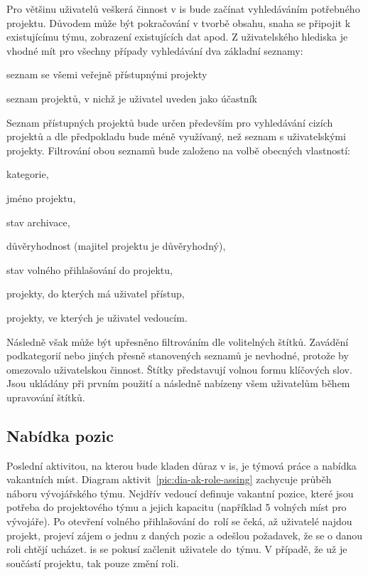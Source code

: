 Pro většinu uživatelů veškerá činnost v \gls{is} bude začínat vyhledáváním potřebného projektu. Důvodem může být pokračování v tvorbě obsahu, snaha se připojit k existujícímu týmu, zobrazení existujících dat apod. Z uživatelského hlediska je vhodné mít pro všechny případy vyhledávání dva základní seznamy:

\begin{ulnar}
   \item seznam se všemi veřejně přístupnými projekty
   \item seznam projektů, v nichž je uživatel uveden jako účastník
\end{ulnar}

Seznam přístupných projektů bude určen především pro vyhledávání cizích projektů a dle předpokladu bude méně využívaný, než seznam s uživatelskými projekty. Filtrování obou seznamů bude založeno na volbě obecných vlastností:

\begin{ulnar}
   \item kategorie,
   \item jméno projektu,
   \item stav archivace,
   \item důvěryhodnost (majitel projektu je důvěryhodný),
   \item stav volného přihlašování do projektu,
   \item projekty, do kterých má uživatel přístup,
   \item projekty, ve kterých je uživatel vedoucím.
\end{ulnar}

Následně však může být upřesněno filtrováním dle volitelných štítků. Zavádění podkategorií nebo jiných přesně stanovených seznamů je nevhodné, protože by omezovalo uživatelskou činnost. Štítky představují volnou formu klíčových slov. Jsou ukládány při prvním použití a následně nabízeny všem uživatelům během upravování štítků.





\subsection{Nabídka pozic}

Poslední aktivitou, na kterou bude kladen důraz v \gls{is}, je týmová práce a nabídka vakantních míst. Diagram aktivit~\ref{pic:dia-ak-role-assing} zachycuje průběh náboru vývojářského týmu. Nejdřív vedoucí definuje vakantní pozice, které jsou potřeba do projektového týmu a jejich kapacitu (například 5 volných míst pro vývojáře). Po otevření volného přihlašování do~rolí se čeká, až uživatelé najdou projekt, projeví zájem o jednu z daných pozic a odešlou požadavek, že se o danou roli chtějí ucházet. \gls{is} se pokusí začlenit uživatele do~týmu. V případě, že už je součástí projektu, tak pouze změní roli.


